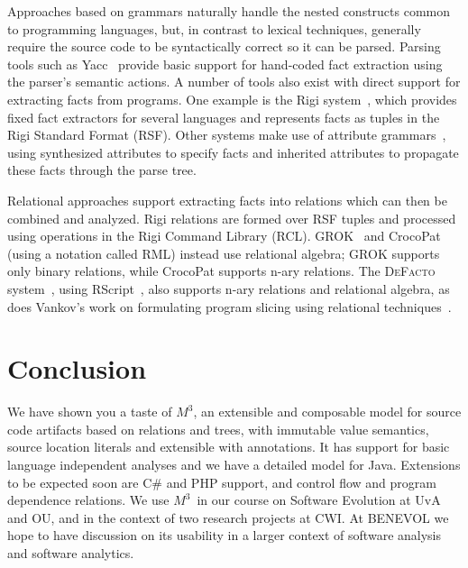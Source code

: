 \documentclass[conference]{IEEEtran}
\newcommand{\Rascal}{\textsc{Rascal}}
\newcommand{\DeFacto}{\textsc{DeFacto}\xspace}
\newcommand{\mthree}{\ensuremath{M^3}}
\begin{document}
Approaches based on grammars naturally handle the nested constructs common to
programming languages, but, in contrast to lexical techniques, generally
require the source code to be syntactically correct so it can be parsed.
Parsing tools such as Yacc~\cite{Yacc} provide basic support for hand-coded
fact extraction using the parser's semantic actions. A number of tools also
exist with direct support for extracting facts from programs. One example is
the Rigi system~\cite{Mueller88}, which provides fixed fact extractors for
several languages and represents facts as tuples in the Rigi Standard Format
(RSF). Other systems make use of attribute
grammars~\cite{FNC2,Paakki95,EkmanHedin07,kiama,DBLP:journals/scp/WykBGK10},
using synthesized attributes to specify facts and inherited attributes to
propagate these facts through the parse tree.

Relational approaches support extracting facts into relations which can then
be combined and analyzed. Rigi relations are formed over RSF tuples and
processed using operations in the Rigi Command Library (RCL).
GROK~\cite{Holt96} and CrocoPat~\cite{BeyerEtAl03,beyer05efficient} (using a
notation called RML) instead use relational algebra; GROK supports only binary
relations, while CrocoPat supports n-ary relations. The \DeFacto
system~\cite{DBLP:conf/sle/BastenK08}, using RScript~\cite{KlintRscript}, also
supports n-ary relations and relational algebra, as does Vankov's work on
formulating program slicing using relational techniques~\cite{Vankov05}.

\section{Conclusion}

We have shown you a taste of \mthree, an extensible and composable model for
source code artifacts based on relations and trees, with immutable value
semantics, source location literals and extensible with annotations. It has
support for basic language independent analyses and we have a detailed model
for Java. Extensions to be expected soon are C\# and PHP support, and control
flow and program dependence relations. We use \mthree\  in our course on
Software Evolution at UvA and OU, and in the context of two research projects
at CWI. At BENEVOL we hope to have discussion on its usability in a larger
context of software analysis and software analytics.



\end{document}
